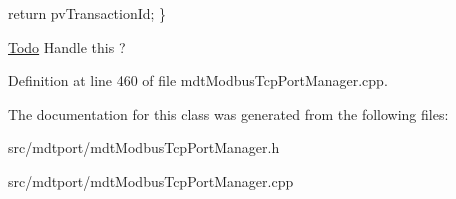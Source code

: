 return pvTransactionId; \} 

\begin{Desc}
\item[\hyperlink{todo__todo000018}{Todo}]Handle this ? \end{Desc}




Definition at line 460 of file mdtModbusTcpPortManager.cpp.



The documentation for this class was generated from the following files:\begin{DoxyCompactItemize}
\item 
src/mdtport/mdtModbusTcpPortManager.h\item 
src/mdtport/mdtModbusTcpPortManager.cpp\end{DoxyCompactItemize}
